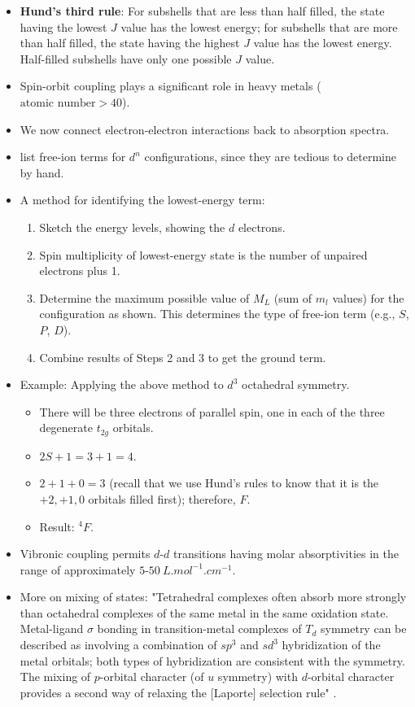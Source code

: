 \documentclass[../notes.tex]{subfiles}
\begin{document}
\begin{itemize}
\begin{itemize}
    \end{itemize}
    \item \textbf{Hund's third rule}: For subshells that are less than half filled, the state having the lowest $J$ value has the lowest energy; for subshells that are more than half filled, the state having the highest $J$ value has the lowest energy. Half-filled subshells have only one possible $J$ value.
    \item Spin-orbit coupling plays a significant role in heavy metals ($\text{atomic number}>40$).
    \item We now connect electron-electron interactions back to absorption spectra.
    \item \textcite{bib:MiesslerFischerTarr} list free-ion terms for $d^n$ configurations, since they are tedious to determine by hand.
    \item A method for identifying the lowest-energy term:
    \begin{enumerate}
        \item Sketch the energy levels, showing the $d$ electrons.
        \item Spin multiplicity of lowest-energy state is the number of unpaired electrons plus 1.
        \item Determine the maximum possible value of $M_L$ (sum of $m_l$ values) for the configuration as shown. This determines the type of free-ion term (e.g., $S$, $P$, $D$).
        \item Combine results of Steps 2 and 3 to get the ground term.
    \end{enumerate}
    \item Example: Applying the above method to $d^3$ octahedral symmetry.
    \begin{itemize}
        \item There will be three electrons of parallel spin, one in each of the three degenerate $t_{2g}$ orbitals.
        \item $2S+1=3+1=4$.
        \item $2+1+0=3$ (recall that we use Hund's rules to know that it is the $+2,+1,0$ orbitals filled first); therefore, $F$.
        \item Result: ${}^4F$.
    \end{itemize}
    \item {}Vibronic coupling permits $d$-$d$  transitions having molar absorptivities in the range of approximately $5$-$\SI[per-mode=reciprocal]{50}{L.mol^{-1}.cm^{-1}}$.
    \item More on mixing of states: "Tetrahedral complexes often absorb more strongly than octahedral complexes of the same metal in the same oxidation state. Metal-ligand $\sigma$ bonding in transition-metal complexes of $T_d$ symmetry can be described as involving a combination of $sp^3$ and $sd^3$ hybridization of the metal orbitals; both types of hybridization are consistent with the symmetry. The mixing of $p$-orbital character (of $u$ symmetry)  with $d$-orbital character provides a second way of relaxing the [Laporte] selection rule" \parencite[414]{bib:MiesslerFischerTarr}.

\end{itemize}
\end{document}
